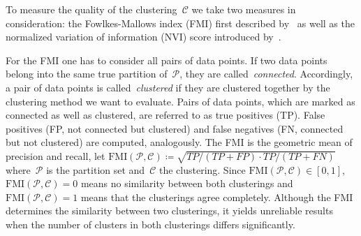 \documentclass{article}
\begin{document}
To measure the quality of the clustering~$\mathcal{C}$ we take two measures in consideration: the Fowlkes-Mallows index (FMI) first described by~\cite{fowkles/etal/1983} as well as the normalized variation of information (NVI) score introduced by~\cite{reichart/etal/2009}.


For the FMI one has to consider all pairs of data points.
If two data points belong into the same true partition of~$\mathcal{P}$, they are called~\emph{connected}.
Accordingly, a pair of data points is called~\emph{clustered} if they are clustered together by the clustering method we want to evaluate.
Pairs of data points, which are marked as connected as well as clustered, are referred to as true positives (TP).
False positives (FP, not connected but clustered) and false negatives (FN, connected but not clustered) are computed, analogously.
The FMI is the geometric mean of precision and recall, let \hbox{$\text{FMI}(\mathcal{P}, \mathcal{C}) \coloneq \sqrt{TP / (TP + FP) \cdot TP / (TP + FN)}$} where~$\mathcal{P}$ is the partition set and~$\mathcal{C}$ the clustering.
Since \hbox{$\text{FMI}(\mathcal{P}, \mathcal{C}) \in [0, 1]$}, $\text{FMI}(\mathcal{P}, \mathcal{C}) = 0$ means no similarity between both clusterings and $\text{FMI}(\mathcal{P}, \mathcal{C}) = 1$ means that the clusterings agree completely.
Although the FMI determines the similarity between two clusterings, it yields unreliable results when the number of clusters in both clusterings differs significantly.
\end{document}
